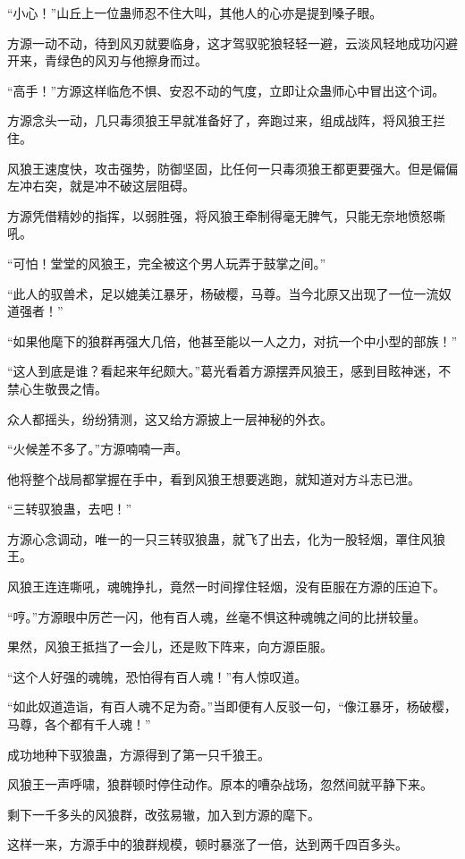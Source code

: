 \begin{this_body}
“小心！”山丘上一位蛊师忍不住大叫，其他人的心亦是提到嗓子眼。

方源一动不动，待到风刃就要临身，这才驾驭驼狼轻轻一避，云淡风轻地成功闪避开来，青绿色的风刃与他擦身而过。

“高手！”方源这样临危不惧、安忍不动的气度，立即让众蛊师心中冒出这个词。

方源念头一动，几只毒须狼王早就准备好了，奔跑过来，组成战阵，将风狼王拦住。

风狼王速度快，攻击强势，防御坚固，比任何一只毒须狼王都更要强大。但是偏偏左冲右突，就是冲不破这层阻碍。

方源凭借精妙的指挥，以弱胜强，将风狼王牵制得毫无脾气，只能无奈地愤怒嘶吼。

“可怕！堂堂的风狼王，完全被这个男人玩弄于鼓掌之间。”

“此人的驭兽术，足以媲美江暴牙，杨破樱，马尊。当今北原又出现了一位一流奴道强者！”

“如果他麾下的狼群再强大几倍，他甚至能以一人之力，对抗一个中小型的部族！”

“这人到底是谁？看起来年纪颇大。”葛光看着方源摆弄风狼王，感到目眩神迷，不禁心生敬畏之情。

众人都摇头，纷纷猜测，这又给方源披上一层神秘的外衣。

“火候差不多了。”方源喃喃一声。

他将整个战局都掌握在手中，看到风狼王想要逃跑，就知道对方斗志已泄。

“三转驭狼蛊，去吧！”

方源心念调动，唯一的一只三转驭狼蛊，就飞了出去，化为一股轻烟，罩住风狼王。

风狼王连连嘶吼，魂魄挣扎，竟然一时间撑住轻烟，没有臣服在方源的压迫下。

“哼。”方源眼中厉芒一闪，他有百人魂，丝毫不惧这种魂魄之间的比拼较量。

果然，风狼王抵挡了一会儿，还是败下阵来，向方源臣服。

“这个人好强的魂魄，恐怕得有百人魂！”有人惊叹道。

“如此奴道造诣，有百人魂不足为奇。”当即便有人反驳一句，“像江暴牙，杨破樱，马尊，各个都有千人魂！”

成功地种下驭狼蛊，方源得到了第一只千狼王。

风狼王一声呼啸，狼群顿时停住动作。原本的嘈杂战场，忽然间就平静下来。

剩下一千多头的风狼群，改弦易辙，加入到方源的麾下。

这样一来，方源手中的狼群规模，顿时暴涨了一倍，达到两千四百多头。


\end{this_body}
